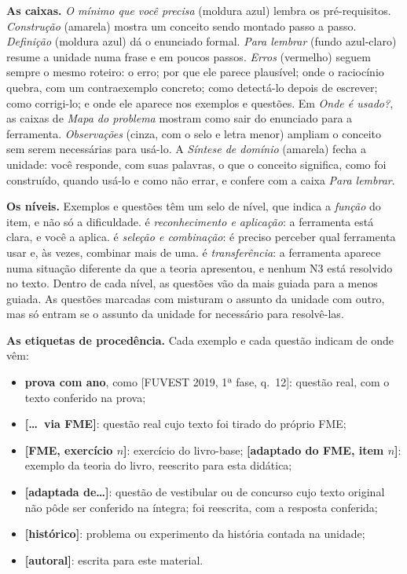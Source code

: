 \textbf{As caixas.} \emph{O mínimo que você precisa} (moldura azul) lembra os pré-requisitos. \emph{Construção} (amarela) mostra um conceito sendo montado passo a passo. \emph{Definição} (moldura azul) dá o enunciado formal. \emph{Para lembrar} (fundo azul-claro) resume a unidade numa frase e em poucos passos. \emph{Erros} (vermelho) seguem sempre o mesmo roteiro: o erro; por que ele parece plausível; onde o raciocínio quebra, com um contraexemplo concreto; como detectá-lo depois de escrever; como corrigi-lo; e onde ele aparece nos exemplos e questões. Em \emph{Onde é usado?}, as caixas de \emph{Mapa do problema} mostram como sair do enunciado para a ferramenta. \emph{Observações} (cinza, com o selo \opcional{} e letra menor) ampliam o conceito sem serem necessárias para usá-lo. A \emph{Síntese de domínio} (amarela) fecha a unidade: você responde, com suas palavras, o que o conceito significa, como foi construído, quando usá-lo e como não errar, e confere com a caixa \emph{Para lembrar}.

\textbf{Os níveis.} Exemplos e questões têm um selo de nível, que indica a \emph{função} do item, e não só a dificuldade.  é \emph{reconhecimento e aplicação}: a ferramenta está clara, e você a aplica.  é \emph{seleção e combinação}: é preciso perceber qual ferramenta usar e, às vezes, combinar mais de uma.  é \emph{transferência}: a ferramenta aparece numa situação diferente da que a teoria apresentou, e nenhum N3 está resolvido no texto. Dentro de cada nível, as questões vão da mais guiada para a menos guiada. As questões marcadas com \integradora{} misturam o assunto da unidade com outro, mas só entram se o assunto da unidade for necessário para resolvê-las.

\textbf{As etiquetas de procedência.} Cada exemplo e cada questão indicam de onde vêm:
\begin{itemize}[leftmargin=1.4em,itemsep=1pt]
  \item \textbf{prova com ano}, como [FUVEST 2019, 1ª fase, q.~12]: questão real, com o texto conferido na prova;
  \item \textbf{[\ldots\ via FME]}: questão real cujo texto foi tirado do próprio FME;
  \item \textbf{[FME, exercício $n$]}: exercício do livro-base; \textbf{[adaptado do FME, item $n$]}: exemplo da teoria do livro, reescrito para esta didática;
  \item \textbf{[adaptada de\ldots]}: questão de vestibular ou de concurso cujo texto original não pôde ser conferido na íntegra; foi reescrita, com a resposta conferida;
  \item \textbf{[histórico]}: problema ou experimento da história contada na unidade;
  \item \textbf{[autoral]}: escrita para este material.
\end{itemize}

